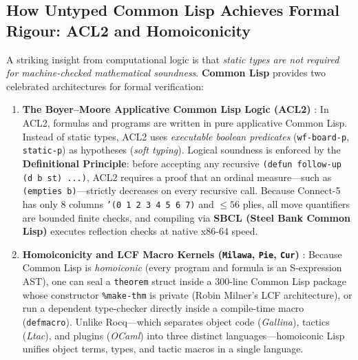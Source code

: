 \documentclass[11pt,reqno]{amsart}
\theoremstyle{plain}
\theoremstyle{definition}
\theoremstyle{remark}
\begin{document}
\subsection{How Untyped Common Lisp Achieves Formal Rigour: ACL2 and Homoiconicity}
A striking insight from computational logic is that \emph{static types are not required for machine-checked mathematical soundness}. \textbf{Common Lisp} provides two celebrated architectures for formal verification:
\begin{enumerate}
    \item \textbf{The Boyer--Moore Applicative Common Lisp Logic (ACL2)} \cite{kaufmann2000computer}:
    In ACL2, formulas and programs are written in pure applicative Common Lisp. Instead of static types, ACL2 uses \emph{executable boolean predicates} (\texttt{wf-board-p}, \texttt{static-p}) as hypotheses (\emph{soft typing}). Logical soundness is enforced by the \textbf{Definitional Principle}: before accepting any recursive \texttt{(defun follow-up (d b st) ...)}, ACL2 requires a proof that an ordinal measure---such as \texttt{(empties b)}---strictly decreases on every recursive call. Because Connect-5 has only 8 columns \texttt{'(0 1 2 3 4 5 6 7)} and $\le 56$ plies, all move quantifiers are bounded finite checks, and compiling via \textbf{SBCL (Steel Bank Common Lisp)} executes reflection checks at native x86-64 speed.
    \item \textbf{Homoiconicity and LCF Macro Kernels (\texttt{Milawa}, \texttt{Pie}, \texttt{Cur})} \cite{davis2009self,friedman2018little}:
    Because Common Lisp is \emph{homoiconic} (every program and formula is an S-expression AST), one can seal a \texttt{theorem} struct inside a 300-line Common Lisp package whose constructor \texttt{\%make-thm} is private (Robin Milner's LCF architecture), or run a dependent type-checker directly inside a compile-time macro (\texttt{defmacro}). Unlike Rocq---which separates object code (\emph{Gallina}), tactics (\emph{Ltac}), and plugins (\emph{OCaml}) into three distinct languages---homoiconic Lisp unifies object terms, types, and tactic macros in a single language.
\end{enumerate}
\end{document}
